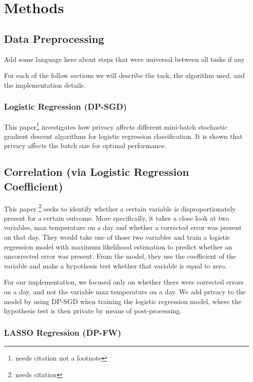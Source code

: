 \documentclass[12pt,letterpaper]{article}
\begin{document}
\section{Methods}

\subsection{Data Preprocessing}

Add some language here about steps that were universal between all tasks if any

For each of the follow sections we will describe the task, the algorithm used, and the implementation details.

\subsubsection{Logistic Regression (DP-SGD)}

This paper\footnote{needs citation not a footnote} investigates how privacy affects different mini-batch stochastic gradient descent algorithms for logistic regression classification. It is shown that privacy affects the batch size for optimal performance.

\subsection{Correlation (via Logistic Regression Coefficient)}

This paper \footnote{needs citation} seeks to identify whether a certain variable is disproportionately present for a certain outcome. 
More specifically, it takes a close look at two variables, max temperature on a day and whether a corrected error was present on that day. 
They would take one of those two variables and train a logistic regression model with maximum likelihood estimation to predict whether an uncorrected error was present.
From the model, they use the coefficient of the variable and make a hypothesis test whether that variable is equal to zero.

For our implementation, we focused only on whether there were corrected errors on a day, and not the variable max temperature on a day.
We add privacy to the model by using DP-SGD when training the logistic regression model, where the hypothesis test is then private by means of post-processing.

\subsubsection{LASSO Regression (DP-FW)}
\end{document}
